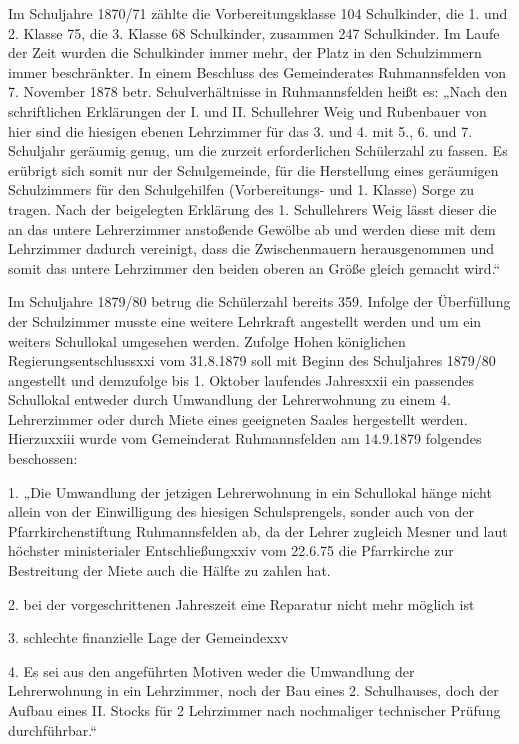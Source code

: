 \documentclass{book}
\begin{document}
Im Schuljahre 1870/71 zählte die Vorbereitungsklasse 104 Schulkinder, die 1. und
2. Klasse 75, die 3. Klasse 68 Schulkinder, zusammen 247 Schulkinder. Im Laufe
der Zeit wurden die Schulkinder immer mehr, der Platz in den Schulzimmern immer
beschränkter. In einem Beschluss des Gemeinderates Ruhmannsfelden von 7.
November 1878 betr. Schulverhältnisse in Ruhmannsfelden heißt es: „Nach den
schriftlichen Erklärungen der I. und II. Schullehrer Weig und Rubenbauer von
hier sind die hiesigen ebenen Lehrzimmer für das 3. und 4. mit 5., 6. und 7.
Schuljahr geräumig genug, um die zurzeit erforderlichen Schülerzahl zu fassen.
Es erübrigt sich somit nur der Schulgemeinde, für die Herstellung eines
geräumigen Schulzimmers für den Schulgehilfen (Vorbereitungs- und 1. Klasse)
Sorge zu tragen. Nach der beigelegten Erklärung des 1. Schullehrers Weig lässt
dieser die an das untere Lehrerzimmer anstoßende Gewölbe ab und werden diese mit
dem Lehrzimmer dadurch vereinigt, dass die Zwischenmauern herausgenommen und
somit das untere Lehrzimmer den beiden oberen an Größe gleich gemacht wird.“

Im Schuljahre 1879/80 betrug die Schülerzahl bereits 359. Infolge der
Überfüllung der Schulzimmer musste eine weitere Lehrkraft angestellt werden und
um ein weiters Schullokal umgesehen werden. Zufolge Hohen königlichen
Regierungsentschlussxxi vom 31.8.1879 soll mit Beginn des Schuljahres 1879/80
angestellt und demzufolge bis 1. Oktober laufendes Jahresxxii ein passendes
Schullokal entweder durch Umwandlung der Lehrerwohnung zu einem 4. Lehrerzimmer
oder durch Miete eines geeigneten Saales hergestellt werden. Hierzuxxiii wurde
vom Gemeinderat Ruhmannsfelden am 14.9.1879 folgendes beschossen:



1. „Die Umwandlung der jetzigen Lehrerwohnung in ein Schullokal hänge nicht
allein von der Einwilligung des hiesigen Schulsprengels, sonder auch von der
Pfarrkirchenstiftung Ruhmannsfelden ab, da der Lehrer zugleich Mesner und laut
höchster ministerialer Entschließungxxiv vom 22.6.75 die Pfarrkirche zur
Bestreitung der Miete auch die Hälfte zu zahlen hat.

2. bei der vorgeschrittenen Jahreszeit eine Reparatur nicht mehr möglich ist

3. schlechte finanzielle Lage der Gemeindexxv

4. Es sei aus den angeführten Motiven weder die Umwandlung der Lehrerwohnung in
ein Lehrzimmer, noch der Bau eines 2. Schulhauses, doch der Aufbau eines II.
Stocks für 2 Lehrzimmer nach nochmaliger technischer Prüfung durchführbar.“
\end{document}
